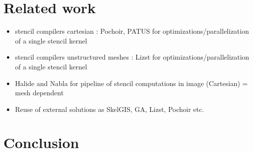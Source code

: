 \documentclass[smallextended]{svjour3}       %
\begin{document}
\section{Related work}
\label{sect:rel}
\begin{itemize}
\item stencil compilers cartesian : Pochoir, PATUS for optimizations/parallelization of a single stencil kernel
\item stencil compilers unstructured meshes : Lizst for optimizations/parallelization of a single stencil kernel
\item Halide and Nabla for pipeline of stencil computations in image (Cartesian) = mesh dependent
\item Reuse of external solutions as SkelGIS, GA, Lizst, Pochoir etc.
\end{itemize}
\section{Conclusion}
\label{sect:concl}




\end{document}
